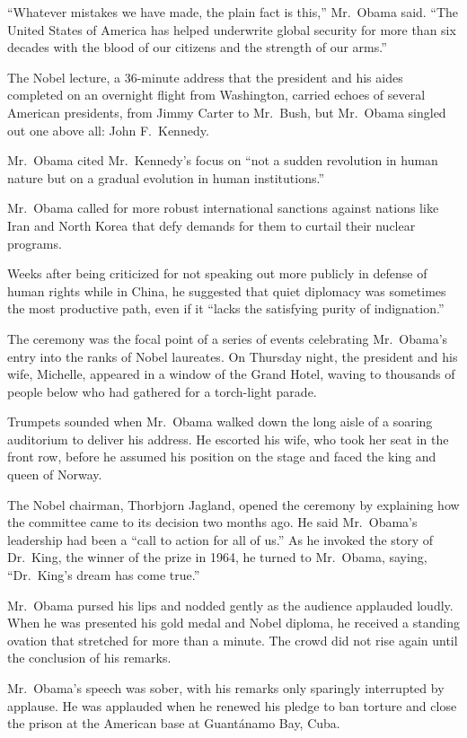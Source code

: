 ﻿\documentclass[12pt]{article}
\begin{document}
``Whatever mistakes we have made, the plain fact is this,'' Mr.~Obama said. ``The United States of
America has helped underwrite global security for more than six decades with the blood of our
citizens and the strength of our arms.''

The Nobel lecture, a 36-minute address that the president and his aides completed on an overnight
flight from Washington, carried echoes of several American presidents, from Jimmy Carter to
Mr.~Bush, but Mr.~Obama singled out one above all: John F.~Kennedy.

Mr.~Obama cited Mr.~Kennedy's focus on ``not a sudden revolution in human nature but on a gradual
evolution in human institutions.''

Mr.~Obama called for more robust international sanctions against nations like Iran and North Korea
that defy demands for them to curtail their nuclear programs.

Weeks after being criticized for not speaking out more publicly in defense of human rights while in
China, he suggested that quiet diplomacy was sometimes the most productive path, even if it ``lacks
the satisfying purity of indignation.''

The ceremony was the focal point of a series of events celebrating Mr.~Obama's entry into the ranks
of Nobel laureates. On Thursday night, the president and his wife, Michelle, appeared in a window of
the Grand Hotel, waving to thousands of people below who had gathered for a torch-light parade.

Trumpets sounded when Mr.~Obama walked down the long aisle of a soaring auditorium to deliver his
address. He escorted his wife, who took her seat in the front row, before he assumed his position on
the stage and faced the king and queen of Norway.

The Nobel chairman, Thorbjorn Jagland, opened the ceremony by explaining how the committee came to
its decision two months ago. He said Mr.~Obama's leadership had been a ``call to action for all of
us.'' As he invoked the story of Dr.~King, the winner of the prize in 1964, he turned to Mr.~Obama,
saying, ``Dr.~King's dream has come true.''

Mr.~Obama pursed his lips and nodded gently as the audience applauded loudly. When he was presented
his gold medal and Nobel diploma, he received a standing ovation that stretched for more than a
minute. The crowd did not rise again until the conclusion of his remarks.

Mr.~Obama's speech was sober, with his remarks only sparingly interrupted by applause. He was
applauded when he renewed his pledge to ban torture and close the prison at the American base at
Guant\'anamo Bay, Cuba.
\end{document}
